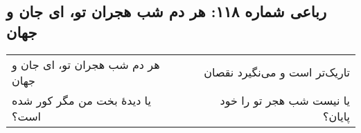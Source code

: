 \begin{center}
\section*{رباعی شماره ۱۱۸: هر دم شب هجران تو، ای جان و جهان}
\label{sec:118}
\begin{longtable}{l p{0.5cm} r}
هر دم شب هجران تو، ای جان و جهان
&&
تاریک‌تر است و می‌نگیرد نقصان
\\
یا دیدهٔ بخت من مگر کور شده است؟
&&
یا نیست شب هجر تو را خود پایان؟
\\
\end{longtable}
\end{center}
